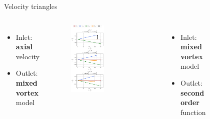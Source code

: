 	{\nologo
	\begin{frame}{Velocity triangles}
		\begin{columns}
				\begin{itemize}	
					\item Inlet: \textbf{axial} velocity
					\item Outlet: \textbf{mixed vortex} model
				\end{itemize}
				\begin{figure}
					\centering
					\includegraphics[width=0.5\textwidth]{figures/rotorVelocityTriangle.pdf}
				\end{figure}
				\begin{itemize}	
					\item Inlet: \textbf{mixed vortex} model
					\item Outlet: \textbf{second order} function 
				\end{itemize}
				\begin{figure}
					\centering

\end{figure}
\end{columns}
\end{frame}}
